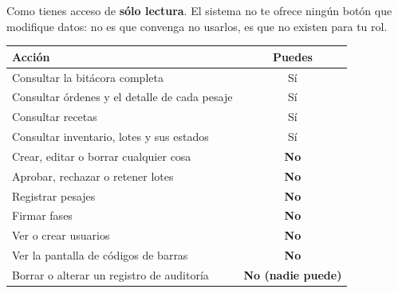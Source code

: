 

\tablaAcceso

\vspace{8pt}

\reglasAcceso


\avisoValidacion

\newpage
{}

Como \manualRol{} tienes acceso de \textbf{sólo lectura}. El sistema no te ofrece
ningún botón que modifique datos: no es que convenga no usarlos, es que no existen
para tu rol.

\begin{center}
\begin{tabularx}{\linewidth}{@{}>{\raggedright\arraybackslash}X c@{}}
\toprule
\textbf{Acción} & \textbf{Puedes} \\
\midrule
Consultar la bitácora completa                 & Sí \\
Consultar órdenes y el detalle de cada pesaje  & Sí \\
Consultar recetas                              & Sí \\
Consultar inventario, lotes y sus estados      & Sí \\
\midrule
Crear, editar o borrar cualquier cosa          & \textbf{No} \\
Aprobar, rechazar o retener lotes              & \textbf{No} \\
Registrar pesajes                              & \textbf{No} \\
Firmar fases                                   & \textbf{No} \\
Ver o crear usuarios                           & \textbf{No} \\
Ver la pantalla de códigos de barras           & \textbf{No} \\
Borrar o alterar un registro de auditoría      & \textbf{No (nadie puede)} \\
\bottomrule
\end{tabularx}
\end{center}

